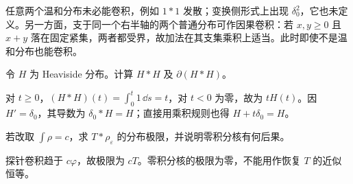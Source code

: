 \begin{remark}[合法范围]
任意两个温和分布未必能卷积，例如 $1*1$ 发散；变换侧形式上出现 $\delta_0^2$，它也未定义。另一方面，支于同一个右半轴的两个普通分布可作因果卷积：若 $x,y\ge0$ 且 $x+y$ 落在固定紧集，两者都受界，故加法在其支集乘积上适当。此时即使不是温和分布也能卷积。
\end{remark}

\begin{exercise}[因果导数]\label{ex:y6-heaviside}
令 $H$ 为 Heaviside 分布。计算 $H*H$ 及 $\partial(H*H)$。
\end{exercise}
\begin{solution}
对 $t\ge0$，$(H*H)(t)=\int_0^t1\,\dd s=t$，对 $t<0$ 为零，故为 $tH(t)$。因 $H'=\delta_0$，其导数为 $\delta_0*H=H$；直接用乘积规则也得 $H+t\delta_0=H$。
\end{solution}

\begin{exercise}[单位质量不可省]\label{ex:y6-mollifier}
若改取 $\int\rho=c$，求 $T*\rho_\varepsilon$ 的分布极限，并说明零积分核有何后果。
\end{exercise}
\begin{solution}
探针卷积趋于 $c\varphi$，故极限为 $cT$。零积分核的极限为零，不能用作恢复 $T$ 的近似恒等。
\end{solution}

